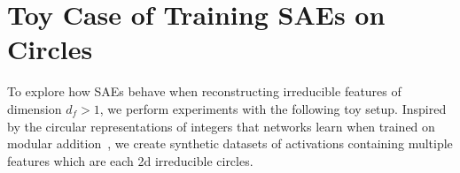 \documentclass{article} %
\theoremstyle{plain}
\theoremstyle{definition}
\begin{document}









\section{Toy Case of Training SAEs on Circles}
\label{appendix:toy}

To explore how SAEs behave when reconstructing irreducible features of dimension $d_f > 1$, we perform experiments with the following toy setup. Inspired by the circular representations of integers that networks learn when trained on modular addition~\citep{neel_grokking, ziming_grokking}, we create synthetic datasets of activations containing multiple features which are each 2d irreducible circles. 
\end{document}
